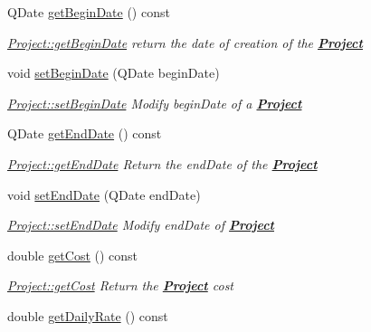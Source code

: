 \begin{DoxyCompactItemize}
Q\-Date \hyperlink{classModels_1_1Project_a31b8e46aabb1327499f7e36f170900e3}{get\-Begin\-Date} () const 
\begin{DoxyCompactList}\small\item\em \hyperlink{classModels_1_1Project_a31b8e46aabb1327499f7e36f170900e3}{Project\-::get\-Begin\-Date} return the date of creation of the {\bfseries \hyperlink{classModels_1_1Project}{Project}} \end{DoxyCompactList}\item 
void \hyperlink{classModels_1_1Project_a07dfb00cbec7442197a91bc0795ab14d}{set\-Begin\-Date} (Q\-Date begin\-Date)
\begin{DoxyCompactList}\small\item\em \hyperlink{classModels_1_1Project_a07dfb00cbec7442197a91bc0795ab14d}{Project\-::set\-Begin\-Date} Modify {\itshape begin\-Date} of a {\bfseries \hyperlink{classModels_1_1Project}{Project}} \end{DoxyCompactList}\item 
Q\-Date \hyperlink{classModels_1_1Project_aaf6792d15dcd65c3708e4a01b80e3108}{get\-End\-Date} () const 
\begin{DoxyCompactList}\small\item\em \hyperlink{classModels_1_1Project_aaf6792d15dcd65c3708e4a01b80e3108}{Project\-::get\-End\-Date} Return the {\itshape end\-Date} of the {\bfseries \hyperlink{classModels_1_1Project}{Project}} \end{DoxyCompactList}\item 
void \hyperlink{classModels_1_1Project_a89e9603b862d0a282e4eb03e122e8c05}{set\-End\-Date} (Q\-Date end\-Date)
\begin{DoxyCompactList}\small\item\em \hyperlink{classModels_1_1Project_a89e9603b862d0a282e4eb03e122e8c05}{Project\-::set\-End\-Date} Modify {\itshape end\-Date} of {\bfseries \hyperlink{classModels_1_1Project}{Project}} \end{DoxyCompactList}\item 
double \hyperlink{classModels_1_1Project_a6ad25c30f89821cd988a7ae92d84b41b}{get\-Cost} () const 
\begin{DoxyCompactList}\small\item\em \hyperlink{classModels_1_1Project_a6ad25c30f89821cd988a7ae92d84b41b}{Project\-::get\-Cost} Return the {\bfseries \hyperlink{classModels_1_1Project}{Project}} {\itshape cost} \end{DoxyCompactList}\item 
double \hyperlink{classModels_1_1Project_a46d74a7452e712d223f1ca444a4cc180}{get\-Daily\-Rate} () const 

\end{DoxyCompactItemize}
